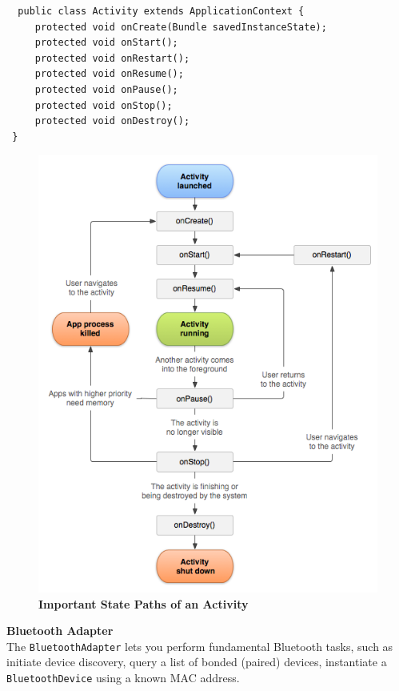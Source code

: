 \begin{lstlisting}
  public class Activity extends ApplicationContext {
     protected void onCreate(Bundle savedInstanceState);
     protected void onStart();    
     protected void onRestart();
     protected void onResume();
     protected void onPause();
     protected void onStop();
     protected void onDestroy();
 }
\end{lstlisting}
\newpage
\begin{figure}[H]
  \centering
    \includegraphics[scale=0.6]{project/images/activity-lifecycle}
  \caption{\textbf{Important State Paths of an Activity}}
\end{figure}
\textbf{Bluetooth Adapter}\\
\hspace*{0.82cm}The \texttt{BluetoothAdapter} lets you perform fundamental Bluetooth tasks, such as initiate device discovery, query a 
list of bonded (paired) devices, instantiate a \texttt{BluetoothDevice} using a known MAC address.\\[0.5cm]
